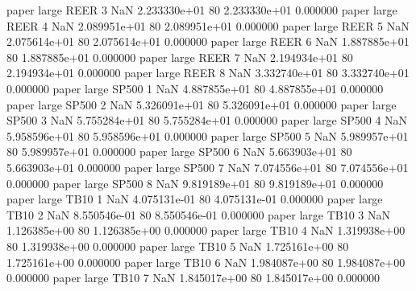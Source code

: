             paper      large     REER                 3                  NaN 2.233330e+01 80   2.233330e+01           0.000000
            paper      large     REER                 4                  NaN 2.089951e+01 80   2.089951e+01           0.000000
            paper      large     REER                 5                  NaN 2.075614e+01 80   2.075614e+01           0.000000
            paper      large     REER                 6                  NaN 1.887885e+01 80   1.887885e+01           0.000000
            paper      large     REER                 7                  NaN 2.194934e+01 80   2.194934e+01           0.000000
            paper      large     REER                 8                  NaN 3.332740e+01 80   3.332740e+01           0.000000
            paper      large    SP500                 1                  NaN 4.887855e+01 80   4.887855e+01           0.000000
            paper      large    SP500                 2                  NaN 5.326091e+01 80   5.326091e+01           0.000000
            paper      large    SP500                 3                  NaN 5.755284e+01 80   5.755284e+01           0.000000
            paper      large    SP500                 4                  NaN 5.958596e+01 80   5.958596e+01           0.000000
            paper      large    SP500                 5                  NaN 5.989957e+01 80   5.989957e+01           0.000000
            paper      large    SP500                 6                  NaN 5.663903e+01 80   5.663903e+01           0.000000
            paper      large    SP500                 7                  NaN 7.074556e+01 80   7.074556e+01           0.000000
            paper      large    SP500                 8                  NaN 9.819189e+01 80   9.819189e+01           0.000000
            paper      large     TB10                 1                  NaN 4.075131e-01 80   4.075131e-01           0.000000
            paper      large     TB10                 2                  NaN 8.550546e-01 80   8.550546e-01           0.000000
            paper      large     TB10                 3                  NaN 1.126385e+00 80   1.126385e+00           0.000000
            paper      large     TB10                 4                  NaN 1.319938e+00 80   1.319938e+00           0.000000
            paper      large     TB10                 5                  NaN 1.725161e+00 80   1.725161e+00           0.000000
            paper      large     TB10                 6                  NaN 1.984087e+00 80   1.984087e+00           0.000000
            paper      large     TB10                 7                  NaN 1.845017e+00 80   1.845017e+00           0.000000

